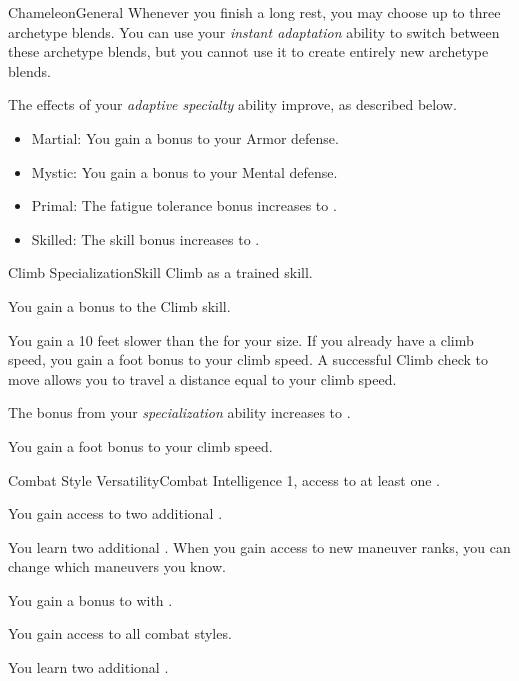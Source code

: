 \begin{feat}{Chameleon}{General}
        Whenever you finish a long rest, you may choose up to three archetype blends.
        You can use your \textit{instant adaptation} ability to switch between these archetype blends, but you cannot use it to create entirely new archetype blends.

         The effects of your \textit{adaptive specialty} ability improve, as described below.
        \begin{itemize}
            \item Martial: You gain a  bonus to your Armor defense.
            \item Mystic: You gain a  bonus to your Mental defense.
            \item Primal: The fatigue tolerance bonus increases to .
            \item Skilled: The skill bonus increases to .
        \end{itemize}
    \end{feat}

    \begin{feat}{Climb Specialization}{Skill}
        \featpre Climb as a trained skill.

         You gain a  bonus to the Climb skill.

         You gain a  10 feet slower than the  for your size.
        If you already have a climb speed, you gain a  foot bonus to your climb speed.
        A successful Climb check to move allows you to travel a distance equal to your climb speed.

         The bonus from your \textit{specialization} ability increases to .

         You gain a  foot bonus to your climb speed.
    \end{feat}

    \begin{feat}{Combat Style Versatility}{Combat}
        \featpre Intelligence 1, access to at least one .

         You gain access to two additional .

         You learn two additional .
        When you gain access to new maneuver ranks, you can change which maneuvers you know.

         You gain a  bonus to  with .

         You gain access to all combat styles.

         You learn two additional .
    \end{feat}

